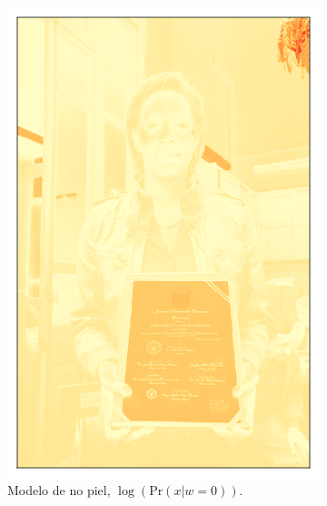 \begin{figure}[ht!]
\begin{subfigure}[t]{0.2\textwidth}
        \includegraphics[width=\textwidth]{../figures/image2/image_02_distbg.png}
        \caption{Modelo de no piel, $\log(\text{Pr}(x | w=0))$.}
    \end{subfigure}
    \hspace{0.25cm}
    \begin{subfigure}[t]{0.2\textwidth}
        \centering

\end{subfigure}
\end{figure}
